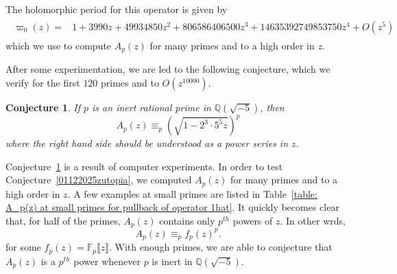 \documentclass[11pt,leqno]{article}
\newtheorem{conj}{Conjecture}
\theoremstyle{remark}
\theoremstyle{definition}
\begin{document}
The holomorphic period for this operator is given by
\begin{align*}
    \begin{split}
        \varpi_0(z)=&1+3990 z+49934850 z^2+806586406500 z^3+14635392749853750 z^4+O\left(z^{5}\right)
    \end{split}
\end{align*}
which we use to compute $A_p(z)$ for many primes and to a high order in $z$.

After some experimentation, we are led to the following conjecture, which we verify for the first $120$ primes and to $O(z^{10000})$.

\begin{conj}
\label{01022026aquamatica}
If $p$ is an inert rational prime in $\mathbb{Q}\left(\sqrt{-5}\right)$, then
\begin{equation*}
    A_p(z)\equiv_p \left(\sqrt{1-2^3\cdot5^5 z}\right)^p
\end{equation*}
where the right hand side should be understood as a power series in $z$.
\end{conj}

Conjecture~\ref{01022026aquamatica} is a result of computer experiments. In order to test Conjecture~\ref{01122025zutopia}, we  computed $A_p(z)$ for many primes and to a high order in $z$. A few examples at small primes are listed in Table~\ref{table: A_p(z) at small primes for pullback of operator 1hat}.  It quickly becomes clear that, for half of the primes, $A_p(z)$ contains only $p^{th}$ powers of $z$. In other wrds,
\begin{equation*}
    A_p(z)\equiv_p f_p(z)^p.
\end{equation*}
for some $f_p(z)=\mathbb{F}_p\llbracket z\rrbracket$.
With enough primes, we are able to conjecture that $A_p(z)$ is a $p^{th}$ power whenever $p$ is inert in $\mathbb{Q}\left(\sqrt{-5}\right)$.
\end{document}

